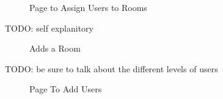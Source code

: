 \documentclass{report}
\begin{document}
\begin{figure}[H]
\caption{Page to Assign Users to Rooms}
\end{figure}
\newpage
	TODO: self explanitory

\begin{figure}[H]
\caption{Adds a Room}
\end{figure}
\newpage
	TODO: be sure to talk about the different levels of users
\begin{figure}[H]
\caption{Page To Add Users}
\end{figure}
\newpage
\end{document}
